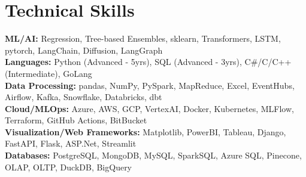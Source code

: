 \section{Technical Skills}
 \begin{itemize}[leftmargin=0.05in, label={}]
    \small{\item{
\textbf{ML/AI:} {Regression, Tree-based Ensembles, sklearn, Transformers, LSTM, pytorch, LangChain, Diffusion, LangGraph} \\
    \textbf{Languages:} {Python (Advanced - 5yrs), SQL (Advanced - 3yrs), C\#/C/C++ (Intermediate), GoLang} \\
    \textbf{Data Processing:} {pandas, NumPy, PySpark, MapReduce, Excel, EventHubs, Airflow, Kafka, Snowflake, Databricks, dbt} \\
    \textbf{Cloud/MLOps:} {Azure, AWS, GCP, VertexAI, Docker, Kubernetes, MLFlow, Terraform, GitHub Actions, BitBucket} \\
    \textbf{Visualization/Web Frameworks:} {Matplotlib, PowerBI, Tableau, Django, FastAPI, Flask, ASP.Net, Streamlit} \\
    \textbf{Databases:} {PostgreSQL, MongoDB, MySQL, SparkSQL, Azure SQL, Pinecone, OLAP, OLTP, DuckDB, BigQuery}}}
\end{itemize}

\vspace{-15pt}  %
